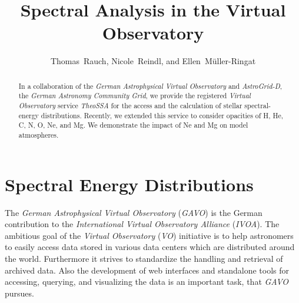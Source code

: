 
\resetcounters




\title{Spectral Analysis in the Virtual Observatory}
\author{Thomas~Rauch, Nicole~Reindl, and Ellen~M\"uller-Ringat
}


\begin{abstract}
In a collaboration of the \emph{German Astrophysical Virtual Observatory} and \emph{AstroGrid-D}, the \emph{German Astronomy Community Grid}, we provide the registered \emph{Virtual Observatory} service \emph{TheoSSA} for the access and the calculation of stellar spectral-energy distributions. Recently, we extended this service to consider opacities of H, He, C, N, O, Ne, and Mg. We demonstrate the impact of Ne and Mg on model atmospheres. 
\end{abstract}


\section{Spectral Energy Distributions }
\label{sect:seds}

The \emph{German Astrophysical Virtual Observatory} (\emph{GAVO}) is the German contribution to the 
\emph{International Virtual Observatory Alliance} (\emph{IVOA}). The ambitious goal of the \emph{Virtual Observatory} (\emph{VO}) initiative is to help astronomers to easily access data stored in various data centers which are distributed around the world. Furthermore it strives to standardize the handling and retrieval of archived data. Also the development of web interfaces and standalone tools for accessing, querying, and visualizing the data is an important task, that \emph{GAVO} pursues.

